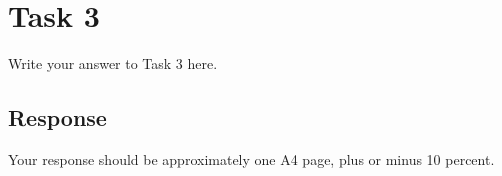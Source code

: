 
\section{Task 3}

Write your answer to Task 3 here.

\subsection{Response}

Your response should be approximately one A4 page, plus or minus 10 percent.